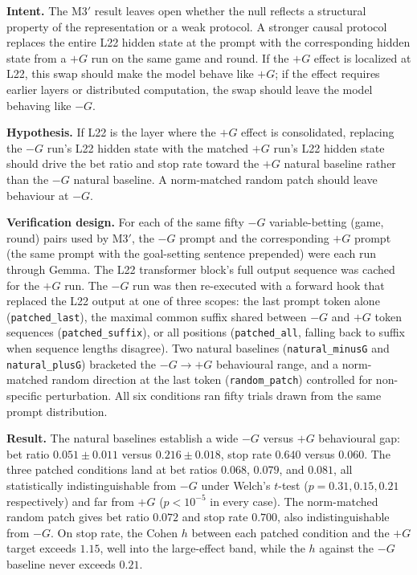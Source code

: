 \documentclass[11pt,a4paper]{article}
\begin{document}
\textbf{Intent.} The M3$'$ result leaves open whether the null reflects a structural property of the representation or a weak protocol. A stronger causal protocol replaces the entire L22 hidden state at the prompt with the corresponding hidden state from a $+G$ run on the same game and round. If the $+G$ effect is localized at L22, this swap should make the model behave like $+G$; if the effect requires earlier layers or distributed computation, the swap should leave the model behaving like $-G$.

\textbf{Hypothesis.} If L22 is the layer where the $+G$ effect is consolidated, replacing the $-G$ run's L22 hidden state with the matched $+G$ run's L22 hidden state should drive the bet ratio and stop rate toward the $+G$ natural baseline rather than the $-G$ natural baseline. A norm-matched random patch should leave behaviour at $-G$.

\textbf{Verification design.} For each of the same fifty $-G$ variable-betting (game, round) pairs used by M3$'$, the $-G$ prompt and the corresponding $+G$ prompt (the same prompt with the goal-setting sentence prepended) were each run through Gemma. The L22 transformer block's full output sequence was cached for the $+G$ run. The $-G$ run was then re-executed with a forward hook that replaced the L22 output at one of three scopes: the last prompt token alone (\texttt{patched\_last}), the maximal common suffix shared between $-G$ and $+G$ token sequences (\texttt{patched\_suffix}), or all positions (\texttt{patched\_all}, falling back to suffix when sequence lengths disagree). Two natural baselines (\texttt{natural\_minusG} and \texttt{natural\_plusG}) bracketed the $-G \to +G$ behavioural range, and a norm-matched random direction at the last token (\texttt{random\_patch}) controlled for non-specific perturbation. All six conditions ran fifty trials drawn from the same prompt distribution.

\textbf{Result.} The natural baselines establish a wide $-G$ versus $+G$ behavioural gap: bet ratio $0.051 \pm 0.011$ versus $0.216 \pm 0.018$, stop rate $0.640$ versus $0.060$. The three patched conditions land at bet ratios $0.068$, $0.079$, and $0.081$, all statistically indistinguishable from $-G$ under Welch's $t$-test ($p = 0.31, 0.15, 0.21$ respectively) and far from $+G$ ($p < 10^{-5}$ in every case). The norm-matched random patch gives bet ratio $0.072$ and stop rate $0.700$, also indistinguishable from $-G$. On stop rate, the Cohen $h$ between each patched condition and the $+G$ target exceeds $1.15$, well into the large-effect band, while the $h$ against the $-G$ baseline never exceeds $0.21$.
\end{document}
